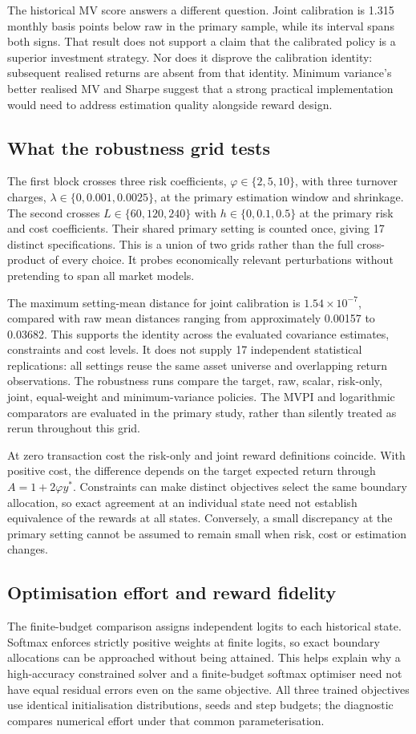 \documentclass[sigconf,anonymous,review]{acmart}
\begin{document}
The historical MV score answers a different question. Joint calibration is 1.315 monthly basis points below raw in the primary sample, while its interval spans both signs. That result does not support a claim that the calibrated policy is a superior investment strategy. Nor does it disprove the calibration identity: subsequent realised returns are absent from that identity. Minimum variance's better realised MV and Sharpe suggest that a strong practical implementation would need to address estimation quality alongside reward design.

\subsection{What the robustness grid tests}
The first block crosses three risk coefficients, $\varphi\in\{2,5,10\}$, with three turnover charges, $\lambda\in\{0,0.001,0.0025\}$, at the primary estimation window and shrinkage. The second crosses $L\in\{60,120,240\}$ with $h\in\{0,0.1,0.5\}$ at the primary risk and cost coefficients. Their shared primary setting is counted once, giving 17 distinct specifications. This is a union of two grids rather than the full cross-product of every choice. It probes economically relevant perturbations without pretending to span all market models.

The maximum setting-mean distance for joint calibration is $1.54\times10^{-7}$, compared with raw mean distances ranging from approximately 0.00157 to 0.03682. This supports the identity across the evaluated covariance estimates, constraints and cost levels. It does not supply 17 independent statistical replications: all settings reuse the same asset universe and overlapping return observations. The robustness runs compare the target, raw, scalar, risk-only, joint, equal-weight and minimum-variance policies. The MVPI and logarithmic comparators are evaluated in the primary study, rather than silently treated as rerun throughout this grid.

At zero transaction cost the risk-only and joint reward definitions coincide. With positive cost, the difference depends on the target expected return through $A=1+2\varphi y^*$. Constraints can make distinct objectives select the same boundary allocation, so exact agreement at an individual state need not establish equivalence of the rewards at all states. Conversely, a small discrepancy at the primary setting cannot be assumed to remain small when risk, cost or estimation changes.

\subsection{Optimisation effort and reward fidelity}
The finite-budget comparison assigns independent logits to each historical state. Softmax enforces strictly positive weights at finite logits, so exact boundary allocations can be approached without being attained. This helps explain why a high-accuracy constrained solver and a finite-budget softmax optimiser need not have equal residual errors even on the same objective. All three trained objectives use identical initialisation distributions, seeds and step budgets; the diagnostic compares numerical effort under that common parameterisation.
\end{document}
